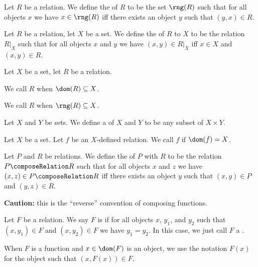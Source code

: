 \begin{definition}
Let $R$ be a relation. We define the  of $R$ to be the
set $\rng(R)$ such that for all objects $x$ we have $x\in\rng(R)$ iff
there exists an object $y$ such that $(y,x)\in R$.
\end{definition}

\begin{definition}
Let $R$ be a relation, let $X$ be a set.
We define the  of $R$ to $X$ to be the relation
$R|_{X}$ such that for all objects $x$ and $y$ we have $(x,y)\in R|_{X}$
iff $x\in X$ and $(x,y)\in R$.
\end{definition}

\begin{definition}
Let $X$ be a set, let $R$ be a relation.

We call $R$  when $\dom(R)\subset X$.

We call $R$  when $\rng(R)\subset X$.
\end{definition}

\begin{definition}
Let $X$ and $Y$ be sets. We define a  of $X$
and $Y$ to be any subset of $X\times Y$.
\end{definition}

\begin{definition}
Let $X$ be a set. Let $f$ be an $X$-defined relation.
We call $f$  if $\dom(f)=X$.
\end{definition}

\begin{definition}
Let $P$ and $R$ be relations. We define the  of
$P$ with $R$ to be the relation $P\composeRelation R$ such that
for all objects $x$ and $z$ we have $(x,z)\in P\composeRelation R$
iff there exists an object $y$ such that $(x,y)\in P$ and $(y,z)\in R$.

\textbf{Caution:} this is the ``reverse'' convention of composing functions.
\end{definition}

\begin{definition}
Let $F$ be a relation. We say $F$ is  if for all
objects $x$, $y_{1}$, and $y_{2}$ such that $(x,y_{1})\in F$ and
$(x,y_{2})\in F$ we have $y_{1}=y_{2}$. In this case, we just call $F$
a .

When $F$ is a function and $x\in\dom(F)$ is an object, we use the
notation $F(x)$ for the object such that $(x, F(x))\in F$.
\end{definition}

